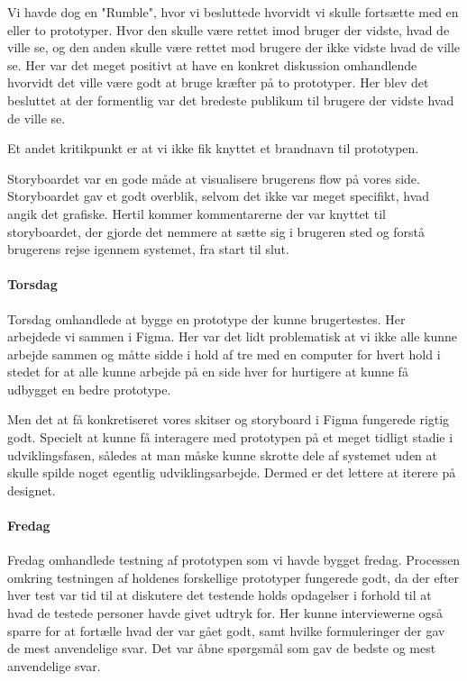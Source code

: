 \documentclass{article}
\begin{document}
Vi havde dog en "Rumble", hvor vi besluttede hvorvidt vi skulle fortsætte med en
eller to prototyper. Hvor den skulle være rettet imod bruger der vidste, hvad de
ville se, og den anden skulle være rettet mod brugere der ikke vidste hvad de
ville se. Her var det meget positivt at have en konkret diskussion omhandlende
hvorvidt det ville være godt at bruge kræfter på to prototyper. Her blev det
besluttet at der formentlig var det bredeste publikum til brugere der vidste
hvad de ville se.

Et andet kritikpunkt er at vi ikke fik knyttet et brandnavn til prototypen.

Storyboardet var en gode måde at visualisere brugerens flow på vores side.
Storyboardet gav et godt overblik, selvom det ikke var meget specifikt, hvad
angik det grafiske. Hertil kommer kommentarerne der var knyttet til
storyboardet, der gjorde det nemmere at sætte sig i brugeren sted og forstå
brugerens rejse igennem systemet, fra start til slut.


\paragraph{Torsdag}

Torsdag omhandlede at bygge en prototype der kunne brugertestes. Her arbejdede
vi sammen i Figma. Her var det lidt problematisk at vi ikke alle kunne arbejde
sammen og måtte sidde i hold af tre med en computer for hvert hold i stedet for
at alle kunne arbejde på en side hver for hurtigere at kunne få udbygget en
bedre prototype.

Men det at få konkretiseret vores skitser og storyboard i Figma fungerede rigtig
godt. Specielt at kunne få interagere med prototypen på et meget tidligt stadie i
udviklingsfasen, således at man måske kunne skrotte dele af systemet uden at
skulle spilde noget egentlig udviklingsarbejde. Dermed er det lettere at iterere
på designet.

\paragraph{Fredag}
Fredag omhandlede testning af prototypen som vi havde bygget fredag. Processen
omkring testningen af holdenes forskellige prototyper fungerede godt, da der
efter hver test var tid til at diskutere det testende holds opdagelser i forhold
til at hvad de testede personer havde givet udtryk for. Her kunne interviewerne
også sparre for at fortælle hvad der var gået godt, samt hvilke formuleringer
der gav de mest anvendelige svar. Det var åbne spørgsmål som gav de bedste og
mest anvendelige svar.
\end{document}
